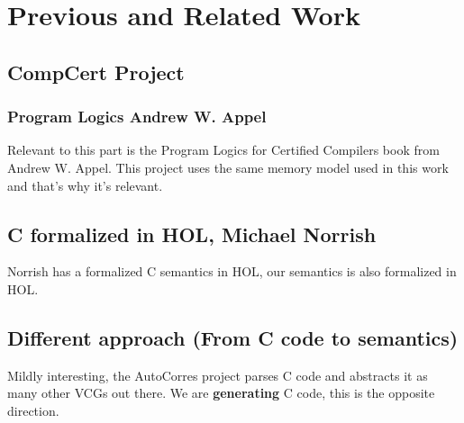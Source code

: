 \chapter{Previous and Related Work}\label{chapter:previous}

\section{CompCert Project}

\subsection{Program Logics Andrew W. Appel}

Relevant to this part is the Program Logics for Certified Compilers book from Andrew W. Appel.
This project uses the same memory model used in this work and that's why it's relevant.

\section{C formalized in HOL, Michael Norrish}

Norrish has a formalized C semantics in HOL, our semantics is also formalized in HOL.

\section{Different approach (From C code to semantics)}

Mildly interesting, the AutoCorres project parses C code and abstracts it as many other VCGs out there.
We are \textbf{generating} C code, this is the opposite direction.
